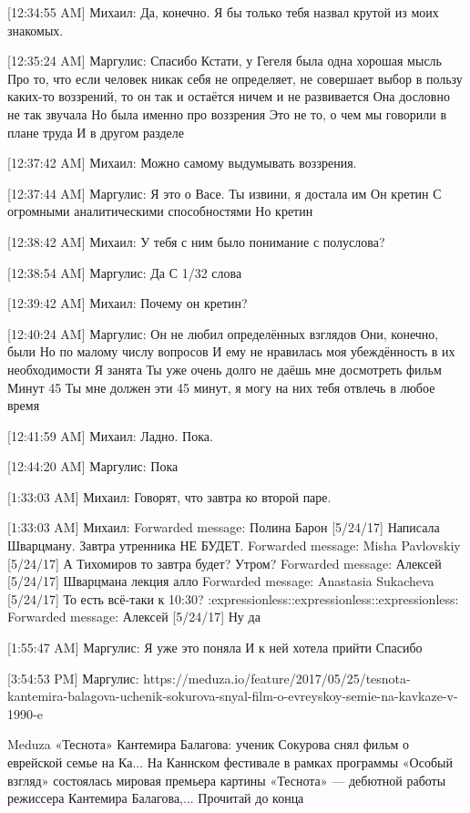 \documentclass{article}
\begin{document}
{[12:34:55 AM] Михаил:
Да, конечно. Я бы только тебя назвал крутой из моих знакомых.

[12:35:24 AM] Маргулис:
Спасибо
 Кстати, у Гегеля была одна хорошая мысль
 Про то, что если человек никак себя не определяет, не совершает выбор в пользу каких-то воззрений, то он так и остаётся ничем и не развивается
 Она дословно не так звучала
 Но была именно про воззрения
 Это не то, о чем мы говорили в плане труда
 И в другом разделе

[12:37:42 AM] Михаил:
Можно самому выдумывать воззрения.

[12:37:44 AM] Маргулис:
Я это о Васе. Ты извини, я достала им
 Он кретин
 С огромными аналитическими способностями
 Но кретин

[12:38:42 AM] Михаил:
У тебя с ним было понимание с полуслова?

[12:38:54 AM] Маргулис:
Да
 С 1/32 слова

[12:39:42 AM] Михаил:
Почему он кретин?

[12:40:24 AM] Маргулис:
Он не любил определённых взглядов
 Они, конечно, были
 Но по малому числу вопросов
 И ему не нравилась моя убеждённость в их необходимости
 Я занята
 Ты уже очень долго не даёшь мне досмотреть фильм
 Минут 45
 Ты мне должен эти 45 минут, я могу на них тебя отвлечь в любое время

[12:41:59 AM] Михаил:
Ладно. Пока.

[12:44:20 AM] Маргулис:
Пока

[1:33:03 AM] Михаил:
Говорят, что завтра ко второй паре.

[1:33:03 AM] Михаил:
Forwarded message: 
Полина Барон [5/24/17] 
Написала Шварцману. Завтра утренника НЕ БУДЕТ.
Forwarded message: Misha Pavlovskiy [5/24/17] 
А Тихомиров то завтра будет? Утром?
Forwarded message: Алексей [5/24/17] 
Шварцмана лекция алло
Forwarded message: Anastasia Sukacheva [5/24/17] 
То есть всё-таки к 10:30? :expressionless::expressionless::expressionless:
Forwarded message: Алексей [5/24/17] 
Ну да

[1:55:47 AM] Маргулис:
Я уже это поняла
 И к ней хотела прийти
 Спасибо

[3:54:53 PM] Маргулис:
https://meduza.io/feature/2017/05/25/tesnota-kantemira-balagova-uchenik-sokurova-snyal-film-o-evreyskoy-semie-na-kavkaze-v-1990-e

Meduza
«Теснота» Кантемира Балагова: ученик Сокурова снял фильм о еврейской семье на Ка...
На Каннском фестивале в рамках программы «Особый взгляд» состоялась мировая премьера картины «Теснота» — дебютной работы режиссера Кантемира Балагова,...
 Прочитай до конца

}
\end{document}
